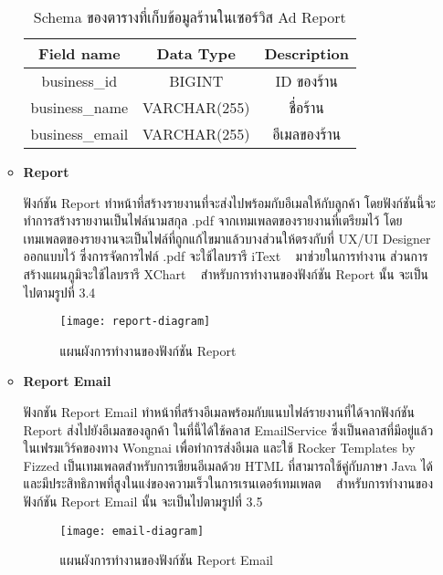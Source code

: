 \begin{enumerate}
\begin{itemize}
		\begin{table}[!h]
			\centering
			\begin{tabular}{|c|c|c|}
				\hline
				\textbf{Field name} & \textbf{Data Type} & \textbf{Description} \\ \hline
				business\_id & BIGINT & ID ของร้าน \\ \hline
				business\_name & VARCHAR(255) & ชื่อร้าน \\ \hline
				business\_email & VARCHAR(255) & อีเมลของร้าน \\ \hline
			\end{tabular}
			\caption{Schema ของตารางที่เก็บข้อมูลร้านในเซอร์วิส Ad Report}
			\label{Table:schema-ad-report-2}
		\end{table}
		
		\item \textbf{Report}
		
		ฟังก์ชัน Report ทำหน้าที่สร้างรายงานที่จะส่งไปพร้อมกับอีเมลให้กับลูกค้า โดยฟังก์ชันนี้จะทำการสร้างรายงานเป็นไฟล์นามสกุล .pdf จากเทมเพลตของรายงานที่เตรียมไว้ โดยเทมเพลตของรายงานจะเป็นไฟล์ที่ถูกแก้ไขมาแล้วบางส่วนให้ตรงกับที่ UX/UI Designer ออกแบบไว้ ซึ่งการจัดการไฟล์ .pdf จะใช้ไลบรารี iText ~\cite{itext} มาช่วยในการทำงาน ส่วนการสร้างแผนภูมิจะใช้ไลบรารี XChart  ~\cite{xchart} สำหรับการทำงานของฟังก์ชัน Report นั้น จะเป็นไปตามรูปที่ 3.4
		
		\begin{figure}[!h]
			\centering
			\texttt{[image: report-diagram]}  
			\caption{แผนผังการทำงานของฟังก์ชัน Report}
			\label{Fig:report-diagram}
		\end{figure}
		
		\item \textbf{Report Email}
		
		ฟังกชัน Report Email ทำหน้าที่สร้างอีเมลพร้อมกับแนบไฟล์รายงานที่ได้จากฟังก์ชัน Report ส่งไปยังอีเมลของลูกค้า ในที่นี้ได้ใช้คลาส EmailService ซึ่งเป็นคลาสที่มีอยู่แล้วในเฟรมเวิร์คของทาง Wongnai เพื่อทำการส่งอีเมล และใช้ Rocker Templates by Fizzed เป็นเทมเพลตสำหรับการเขียนอีเมลด้วย HTML ที่สามารถใช้คู่กับภาษา Java ได้ และมีประสิทธิภาพที่สูงในแง่ของความเร็วในการเรนเดอร์เทมเพลต ~\cite{rocker} สำหรับการทำงานของฟังก์ชัน Report Email นั้น จะเป็นไปตามรูปที่ 3.5
			
		\begin{figure}[!h]
			\centering
			\texttt{[image: email-diagram]}  
			\caption{แผนผังการทำงานของฟังก์ชัน Report Email}
			\label{Fig:email-diagram}
		\end{figure}
			

\end{itemize}
\end{enumerate}
